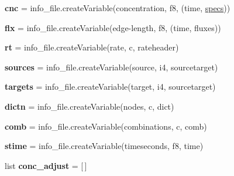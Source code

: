 \begin{DoxyCompactItemize}
{\bfseries cnc} = info\+\_\+file.\+create\+Variable(\textquotesingle{}concentration\textquotesingle{}, \textquotesingle{}f8\textquotesingle{}, (\textquotesingle{}time\textquotesingle{}, \textquotesingle{}\mbox{\hyperlink{namespaceropa__tool_aa744f70435f5581e7e9d31783776f50c}{specs}}\textquotesingle{}))
\item 
\mbox{\label{namespaceropa__tool_a7a5fdc844f36ecfd5a9b3eb8b532bba5}} 
{\bfseries flx} = info\+\_\+file.\+create\+Variable(\textquotesingle{}edge-\/length\textquotesingle{}, \textquotesingle{}f8\textquotesingle{}, (\textquotesingle{}time\textquotesingle{}, \textquotesingle{}fluxes\textquotesingle{}))
\item 
\mbox{\label{namespaceropa__tool_ac84a9ba934373685cc245d7a3838a273}} 
{\bfseries rt} = info\+\_\+file.\+create\+Variable(\textquotesingle{}rate\textquotesingle{}, \textquotesingle{}c\textquotesingle{}, \textquotesingle{}rateheader\textquotesingle{})
\item 
\mbox{\label{namespaceropa__tool_a093c6241e7252409d3b58c5fe9fbcbc1}} 
{\bfseries sources} = info\+\_\+file.\+create\+Variable(\textquotesingle{}source\textquotesingle{}, \textquotesingle{}i4\textquotesingle{}, \textquotesingle{}sourcetarget\textquotesingle{})
\item 
\mbox{\label{namespaceropa__tool_ad00c504f87af16df2a5d7c521fb4fc2e}} 
{\bfseries targets} = info\+\_\+file.\+create\+Variable(\textquotesingle{}target\textquotesingle{}, \textquotesingle{}i4\textquotesingle{}, \textquotesingle{}sourcetarget\textquotesingle{})
\item 
\mbox{\label{namespaceropa__tool_a33f136db192dc764f4dc2e8f999928a6}} 
{\bfseries dictn} = info\+\_\+file.\+create\+Variable(\textquotesingle{}nodes\textquotesingle{}, \textquotesingle{}c\textquotesingle{}, \textquotesingle{}dict\textquotesingle{})
\item 
\mbox{\label{namespaceropa__tool_ab593554c0a9637a11dd87b1a19b078e5}} 
{\bfseries comb} = info\+\_\+file.\+create\+Variable(\textquotesingle{}combinations\textquotesingle{}, \textquotesingle{}c\textquotesingle{}, \textquotesingle{}comb\textquotesingle{})
\item 
\mbox{\label{namespaceropa__tool_a76504265909ca51dedfe21f21e86e0d7}} 
{\bfseries stime} = info\+\_\+file.\+create\+Variable(\textquotesingle{}timeseconds\textquotesingle{}, \textquotesingle{}f8\textquotesingle{}, \textquotesingle{}time\textquotesingle{})
\item 
\mbox{\label{namespaceropa__tool_a3d47fe71d27ae723d19e08111dc7203a}} 
list {\bfseries conc\+\_\+adjust} = \mbox{[}$\,$\mbox{]}
\end{DoxyCompactItemize}


